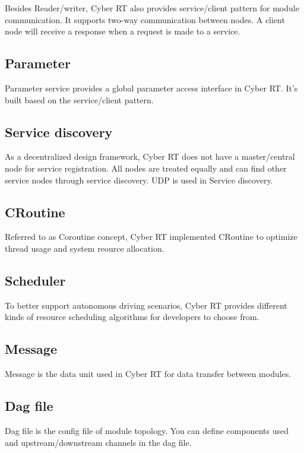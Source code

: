 Besides Reader/writer, Cyber R\-T also provides service/client pattern for module communication. It supports two-\/way communication between nodes. A client node will receive a response when a request is made to a service.

\subsection*{Parameter}

Parameter service provides a global parameter access interface in Cyber R\-T. It's built based on the service/client pattern.

\subsection*{Service discovery}

As a decentralized design framework, Cyber R\-T does not have a master/central node for service registration. All nodes are treated equally and can find other service nodes through {\ttfamily service discovery}. {\ttfamily U\-D\-P} is used in Service discovery.

\subsection*{C\-Routine}

Referred to as Coroutine concept, Cyber R\-T implemented C\-Routine to optimize thread usage and system reource allocation.

\subsection*{Scheduler}

To better support autonomous driving scenarios, Cyber R\-T provides different kinds of resource scheduling algorithms for developers to choose from.

\subsection*{Message}

Message is the data unit used in Cyber R\-T for data transfer between modules.

\subsection*{Dag file}

Dag file is the config file of module topology. You can define components used and upstream/downstream channels in the dag file.

